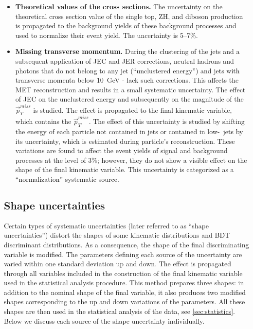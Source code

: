 \begin{itemize}
\item{\bf Theoretical values of the cross sections.} 
The uncertainty on the theoretical cross section value of the single top, ZH, and diboson production is propagated to the background yields of these background processes and used to normalize their event yield. The uncertainty is 5--7\%. 

\item{\bf Missing transverse momentum.} 
During the clustering of the jets and a subsequent application of JEC and JER corrections, 
neutral hadrons and photons that do not belong to any jet (``unclustered energy'') and jets with transverse momenta below 10~GeV - lack such corrections. This affects the MET reconstruction and results in a small systematic uncertainty. The effect of JEC on the unclustered energy and subsequently on the magnitude of the $\vec{p}^{miss}_T$ is studied. The effect is propagated to the final kinematic variable, which contains the $\vec{p}^{miss}_T$. The effect of this uncertainty is studied by shifting the energy of each particle not contained in jets or contained in low-\pt~jets by its uncertainty, which is estimated during particle's reconstruction. These variations are found to affect the event yields of signal and background processes at the level of 3\%; however, they do not show a visible effect on the shape of the final kinematic variable. This uncertainty is categorized as a ``normalization'' systematic source.

\end{itemize}

\subsection{Shape uncertainties}
\label{sec:shapes}

Certain types of systematic uncertainties (later referred to as ``shape uncertainties'') distort the shapes of some 
kinematic distributions and BDT discriminant distributions. As a consequence, the shape of the final discriminating variable is modified. The parameters defining each source of the uncertainty are varied within one standard deviation up and down. The effect is propagated through all variables included in the construction of the final kinematic variable used in the statistical analysis procedure. This method prepares three shapes: in addition to the nominal shape of the final variable, it also produces two modified shapes corresponding to the up and down variations of the parameters. All these shapes are then used in the statistical analysis of the data, see \ref{sec:statistics}. Below we discuss each source of the shape uncertainty individually.

